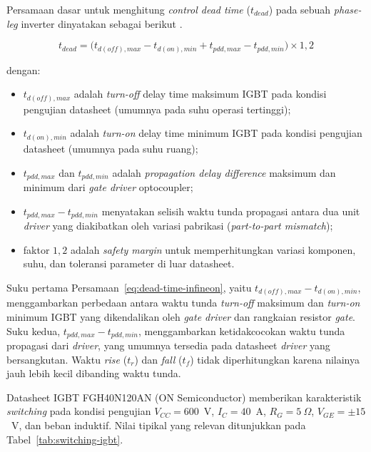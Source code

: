 Persamaan dasar untuk menghitung \emph{control dead time}
($t_{dead}$) pada sebuah \emph{phase-leg} inverter dinyatakan
sebagai berikut \parencite{infineon_deadtime2021}.

\begin{equation}
  t_{dead} = \bigl( t_{d(off),max} - t_{d(on),min} + t_{pdd,max} - t_{pdd,min} \bigr) \times 1{,}2
  \label{eq:dead-time-infineon}
\end{equation}

dengan:
\begin{itemize}
  \item $t_{d(off),max}$ adalah \emph{turn-off} delay time maksimum
        IGBT pada kondisi pengujian datasheet (umumnya pada suhu
        operasi tertinggi);
  \item $t_{d(on),min}$ adalah \emph{turn-on} delay time minimum
        IGBT pada kondisi pengujian datasheet (umumnya pada suhu
        ruang);
  \item $t_{pdd,max}$ dan $t_{pdd,min}$ adalah \emph{propagation
        delay difference} maksimum dan minimum dari \emph{gate
        driver} optocoupler;
  \item $t_{pdd,max} - t_{pdd,min}$ menyatakan selisih waktu tunda
        propagasi antara dua unit \emph{driver} yang diakibatkan
        oleh variasi pabrikasi (\emph{part-to-part mismatch});
  \item faktor $1{,}2$ adalah \emph{safety margin} untuk
        memperhitungkan variasi komponen, suhu, dan toleransi
        parameter di luar datasheet.
\end{itemize}

Suku pertama Persamaan~\eqref{eq:dead-time-infineon}, yaitu
$t_{d(off),max} - t_{d(on),min}$, menggambarkan perbedaan antara
waktu tunda \emph{turn-off} maksimum dan \emph{turn-on} minimum
IGBT yang dikendalikan oleh \emph{gate driver} dan rangkaian
resistor \emph{gate}. Suku kedua, $t_{pdd,max} - t_{pdd,min}$,
menggambarkan ketidakcocokan waktu tunda propagasi dari
\emph{driver}, yang umumnya tersedia pada datasheet \emph{driver}
yang bersangkutan. Waktu \emph{rise} ($t_r$) dan \emph{fall}
($t_f$) tidak diperhitungkan karena nilainya jauh lebih kecil
dibanding waktu tunda.

Datasheet IGBT FGH40N120AN (ON Semiconductor) memberikan
karakteristik \emph{switching} pada kondisi pengujian
$V_{CC} = 600$~V, $I_C = 40$~A, $R_G = 5~\Omega$,
$V_{GE} = \pm 15$~V, dan beban induktif. Nilai tipikal yang
relevan ditunjukkan pada Tabel~\ref{tab:switching-igbt}.

